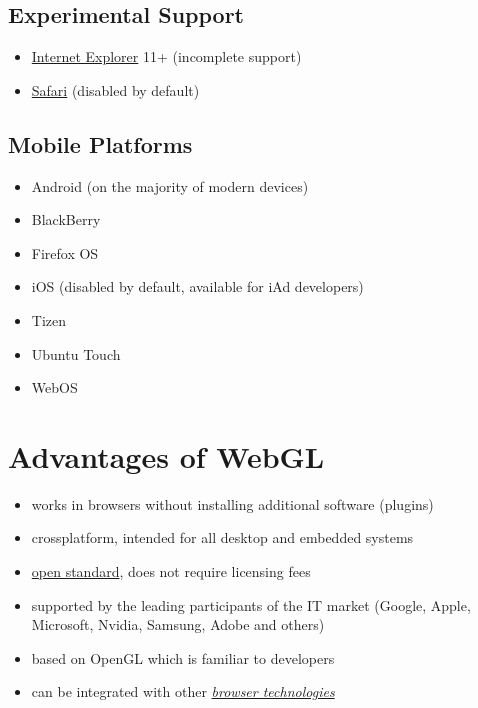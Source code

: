 \documentclass[a4paper,12pt,oneside]{sphinxmanual}
\begin{document}
\subsection{Experimental Support}
\label{about:id6}\begin{itemize}
\item {} 
\href{http://windows.microsoft.com/en-us/internet-explorer/download-ie}{Internet Explorer} 11+ (incomplete support)

\item {} 
\href{http://www.apple.com/safari/}{Safari} (disabled by default)

\end{itemize}


\subsection{Mobile Platforms}
\label{about:id7}\begin{itemize}
\item {} 
Android (on the majority of modern devices)

\item {} 
BlackBerry

\item {} 
Firefox OS

\item {} 
iOS (disabled by default, available for iAd developers)

\item {} 
Tizen

\item {} 
Ubuntu Touch

\item {} 
WebOS

\end{itemize}


\section{Advantages of WebGL}
\label{about:about-webgl-benefits}\label{about:index-5}\label{about:id8}\begin{itemize}
\item {} 
works in browsers without installing additional software (plugins)

\item {} 
crossplatform, intended for all desktop and embedded systems

\item {} 
\href{http://en.wikipedia.org/wiki/Open\_standard}{open standard}, does not require licensing fees

\item {} 
supported by the leading participants of the IT market (Google, Apple, Microsoft, Nvidia, Samsung, Adobe and others)

\item {} 
based on OpenGL which is familiar to developers

\item {} 
can be integrated with other {\hyperref[about:about-browser-tech]{\emph{browser technologies}}}

\end{itemize}
\end{document}
